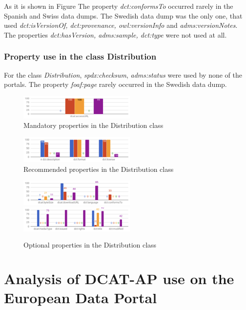 \documentclass[<options>]{elsarticle}
\begin{document}
As it is shown in Figure The property \textit{dct:conformsTo} occurred rarely in the Spanish and Swiss data dumps. The Swedish data dump was the only one, that used \textit{dct:isVersionOf, dct:provenance, owl:versionInfo} and \textit{adms:versionNotes}. The properties  \textit{dct:hasVersion, adms:sample, dct:type} were not used at all.

\subsubsection{Property use in the class Distribution}
For the class \textit{Distribution}, \textit{spdx:checksum}, \textit{adms:status} were used by none of the portals. The property \textit{foaf:page} rarely occurred in the Swedish data dump.

\begin{figure}[H]
\includegraphics{replace12.png}
\caption{Mandatory properties in the Distribution class}
\end{figure}

\begin{figure}[H]
\includegraphics{replace13.png}
\caption{Recommended properties in the Distribution class}
\end{figure}

\begin{figure}[H]
\includegraphics{replace14.png}
\includegraphics{replace15.png}
\caption{Optional properties in the Distribution class}
\end{figure}

\section{Analysis of DCAT-AP use on the European Data Portal}
\end{document}
